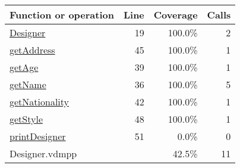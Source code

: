 \bigskip
\begin{longtable}{|l|r|r|r|}
\hline
Function or operation & Line & Coverage & Calls \\
\hline
\hline
\hyperref[Designer:19]{Designer} & 19&100.0\% & 2 \\
\hline
\hyperref[getAddress:45]{getAddress} & 45&100.0\% & 1 \\
\hline
\hyperref[getAge:39]{getAge} & 39&100.0\% & 1 \\
\hline
\hyperref[getName:36]{getName} & 36&100.0\% & 5 \\
\hline
\hyperref[getNationality:42]{getNationality} & 42&100.0\% & 1 \\
\hline
\hyperref[getStyle:48]{getStyle} & 48&100.0\% & 1 \\
\hline
\hyperref[printDesigner:51]{printDesigner} & 51&0.0\% & 0 \\
\hline
\hline
Designer.vdmpp & & 42.5\% & 11 \\
\hline
\end{longtable}


